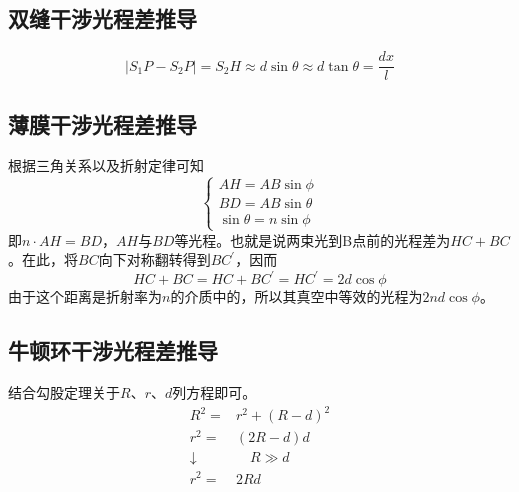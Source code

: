 \subsection{双缝干涉光程差推导}

\begin{equation*}
    |S_1P-S_2P|=S_2H\approx d\sin\theta\approx d\tan\theta=\frac{dx}{l}
\end{equation*}

\subsection{薄膜干涉光程差推导}

根据三角关系以及折射定律可知
\begin{equation*}
    \begin{cases}
        AH=AB\sin\phi\\
        BD=AB\sin\theta\\
        \sin\theta=n\sin\phi
    \end{cases}
\end{equation*}
即$n\cdot AH=BD$，$AH$与$BD$等光程。也就是说两束光到B点前的光程差为$HC+BC$。在此，将$BC$向下对称翻转得到$BC^\prime$，因而
\begin{equation*}
    HC+BC=HC+BC^\prime=HC^\prime=2d\cos\phi
\end{equation*}
由于这个距离是折射率为$n$的介质中的，所以其真空中等效的光程为$2nd\cos\phi$。

\subsection{牛顿环干涉光程差推导}

结合勾股定理关于$R$、$r$、$d$列方程即可。
\begin{align*}
    R^2=&r^2+(R-d)^2\\
    r^2=&(2R-d)d\\
    \downarrow&\quad R\gg d\\
    r^2=&2Rd
\end{align*}
